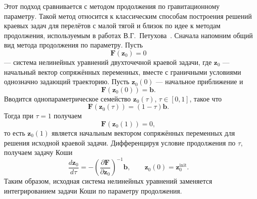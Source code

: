 Этот подход сравнивается с методом продолжения по гравитационному параметру. Такой метод относится к классическим способам построения решений краевых задач для перелётов с малой тягой и близок по идее к методам продолжения, используемым в работах В.Г.~Петухова~\cite{petukhov_method_2012}. Сначала напомним общий вид метода продолжения по параметру. Пусть
\begin{equation}
	\mathbf F(\mathbf z_0)=0
\end{equation}
--- система нелинейных уравнений двухточечной краевой задачи, где \(\mathbf z_0\) --- начальный вектор сопряжённых переменных, вместе с граничными условиями однозначно задающий траекторию. Пусть \(\mathbf z_0(0)\) --- начальное приближение и
\begin{equation}
	\mathbf F(\mathbf z_0(0))=\mathbf b.
\end{equation}
Вводится однопараметрическое семейство \(\mathbf z_0(\tau)\), \(\tau\in[0,1]\), такое что
\begin{equation}
	\mathbf F(\mathbf z_0(\tau))=(1-\tau)\mathbf b.
\end{equation}
Тогда при \(\tau=1\) получаем
\begin{equation}
	\mathbf F(\mathbf z_0(1))=0,
\end{equation}
то есть \(\mathbf z_0(1)\) является начальным вектором сопряжённых переменных для решения исходной краевой задачи. Дифференцируя условие продолжения по \(\tau\), получаем задачу Коши
\begin{equation}
	\frac{d\mathbf z_0}{d\tau}
	=
	-
	\left(
	\frac{\partial \mathbf F}{\partial \mathbf z_0}
	\right)^{-1}
	\mathbf b,
	\qquad
	\mathbf z_0(0)=\mathbf z_0^{\mathrm{init}}.
\end{equation}
Таким образом, исходная система нелинейных уравнений заменяется интегрированием задачи Коши по параметру продолжения.

